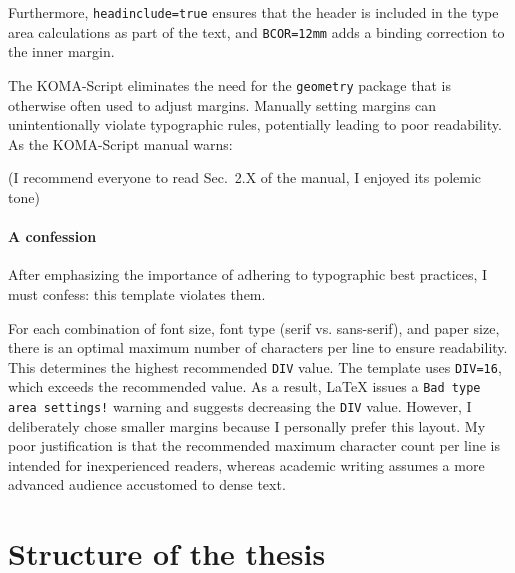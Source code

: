 Furthermore, \verb|headinclude=true| ensures that the header is included in the type area calculations as part of the text, and \verb|BCOR=12mm| adds a binding correction to the inner margin.

The KOMA-Script eliminates the need for the \verb|geometry| package that is otherwise often used to adjust margins. Manually setting margins can unintentionally violate typographic rules, potentially leading to poor readability. As the KOMA-Script manual warns:

(I recommend everyone to read Sec.~2.X of the manual, I enjoyed its polemic tone)

\paragraph{A confession} After emphasizing the importance of adhering to typographic best practices, I must confess: this template violates them.

For each combination of font size, font type (serif vs. sans-serif), and paper size, there is an optimal maximum number of characters per line to ensure readability. This determines the highest recommended \verb|DIV| value. The template uses \verb|DIV=16|, which exceeds the recommended value. As a result, LaTeX issues a \verb|Bad type area settings!| warning and suggests decreasing the \verb|DIV| value.
However, I deliberately chose smaller margins because I personally prefer this layout. My poor justification is that the recommended maximum character count per line is intended for inexperienced readers, whereas academic writing assumes a more advanced audience accustomed to dense text.



\section{Structure of the thesis}

